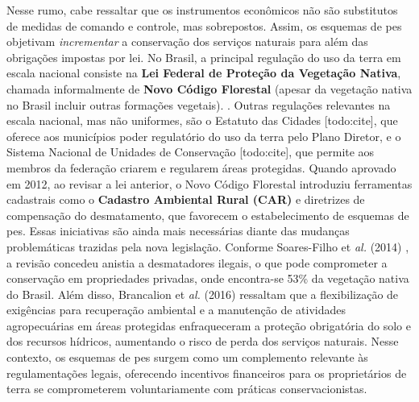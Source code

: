 \documentclass[./main.tex]{subfiles}
\begin{document}
\par Nesse rumo, cabe ressaltar que os instrumentos econômicos não são substitutos de medidas de comando e controle, mas sobrepostos. Assim, os esquemas de \acrshort{pes} objetivam \textit{incrementar} a conservação dos serviços naturais para além das obrigações impostas por lei. No Brasil, a principal regulação do uso da terra em escala nacional consiste na \textbf{Lei Federal de Proteção da Vegetação Nativa}, chamada informalmente de \textbf{Novo Código Florestal} (apesar da vegetação nativa no Brasil incluir outras formações vegetais). \cite{brasil12651}. Outras regulações relevantes na escala nacional, mas não uniformes, são o Estatuto das Cidades [todo:cite], que oferece aos municípios poder regulatório do uso da terra pelo Plano Diretor, e o Sistema Nacional de Unidades de Conservação [todo:cite], que permite aos membros da federação criarem e regularem áreas protegidas. Quando aprovado em 2012, ao revisar a lei anterior, o Novo Código Florestal introduziu ferramentas cadastrais como o \textbf{Cadastro Ambiental Rural (CAR)} e diretrizes de compensação do desmatamento, que favorecem o estabelecimento de esquemas de \acrshort{pes}. Essas iniciativas são ainda mais necessárias diante das mudanças problemáticas trazidas pela nova legislação. Conforme Soares-Filho et \textit{al.} (2014) \cite{Soares-filho2014a}, a revisão concedeu anistia a desmatadores ilegais, o que pode comprometer a conservação em propriedades privadas, onde encontra-se 53\% da vegetação nativa do Brasil. Além disso, Brancalion et \textit{al.} (2016) \cite{Brancalion2016a} ressaltam que a flexibilização de exigências para recuperação ambiental e a manutenção de atividades agropecuárias em áreas protegidas enfraqueceram a proteção obrigatória do solo e dos recursos hídricos, aumentando o risco de perda dos serviços naturais. Nesse contexto, os esquemas de \acrshort{pes} surgem como um complemento relevante às regulamentações legais, oferecendo incentivos financeiros para os proprietários de terra se comprometerem voluntariamente com práticas conservacionistas. 
\end{document}
